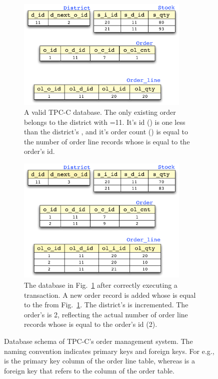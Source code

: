 \begin{figure}[t]
  \centering
	\begin{subfigure}{0.48\textwidth}
		\includegraphics[width=0.9\textwidth]{Figures/schema1}
    \caption{A valid TPC-C database. The only existing order belongs
      to the district with =11. It's id () is one
      less than the district's , and it's order
      count () is equal to the number of order line
      records whose  is equal to the order's id.  }
		\label{fig:tpcc_db1}
	\end{subfigure}
	\begin{subfigure}{0.48\textwidth}
		\includegraphics[width=0.9\textwidth]{Figures/schema2}
    \caption{The database in Fig.~\ref{fig:tpcc_db1} after correctly
      executing a  transaction. A new order record is
      added whose  is equal to the  from
      Fig.~\ref{fig:tpcc_db1}. The district's  is
      incremented. The order's  is 2, reflecting the
      actual number of order line records whose  is equal
      to the order's id (2).}
		\label{fig:tpcc_db2}
	\end{subfigure}

\caption{Database schema of TPC-C's order management system.
  The naming
  convention indicates primary keys and foreign keys. For e.g.,
   is the primary key column of the order line table,
  whereas  is a foreign key that refers to the 
  column of the order table.}
\label{fig:schema}
\end{figure}

